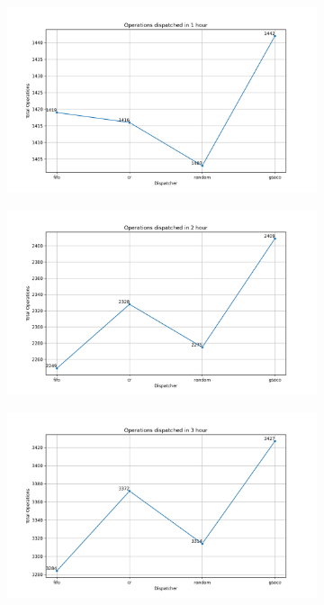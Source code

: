 \begin{figure}[ht]
	\centering
	\begin{subfigure}{0.32\textwidth}
		\includegraphics[width=\textwidth]{LVHM/total_operations_3600s.png}
	\end{subfigure}\hfill
	\begin{subfigure}{0.32\textwidth}
		\includegraphics[width=\textwidth]{LVHM/total_operations_7200s.png}
	\end{subfigure}\hfill
	\begin{subfigure}{0.32\textwidth}
		\includegraphics[width=\textwidth]{LVHM/total_operations_10800s.png}

\end{subfigure}
\end{figure}
